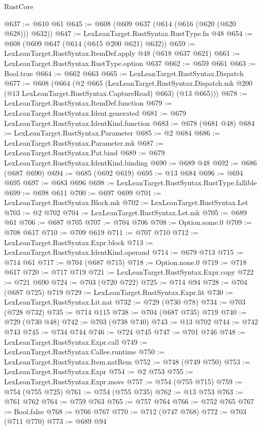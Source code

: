 \begin{lexlean}{RustCore}
\begin{coremodule}
@637 := @610 @61
@645 := @608 (@609 @637 (@614 (@616 (@620 (@620 @628))) @632))
@647 := LexLeanTarget.RustSyntax.RustType.fn @48
@654 := @608 (@609 @647 (@614 (@615 @200 @621) @632))
@659 := LexLeanTarget.RustSyntax.ItemDef.apply @48 (@618 @637 @621)
@661 := LexLeanTarget.RustSyntax.RustType.option @637
@662 := @659 @661
@663 := Bool.true
@664 := @662 @663
@665 := LexLeanTarget.RustSyntax.Dispatch
@677 := @608
    (@664
      (@2
        @665
        (LexLeanTarget.RustSyntax.Dispatch.mk @200 (@13 LexLeanTarget.RustSyntax.CaptureRead) @663)
        (@13 @665)))
@678 := LexLeanTarget.RustSyntax.ItemDef.function
@679 := LexLeanTarget.RustSyntax.Ident.generated
@681 := @679 LexLeanTarget.RustSyntax.IdentKind.function
@683 := @678 (@681 @48)
@684 := LexLeanTarget.RustSyntax.Parameter
@685 := @2 @684
@686 := LexLeanTarget.RustSyntax.Parameter.mk
@687 := LexLeanTarget.RustSyntax.Pat.bind
@689 := @679 LexLeanTarget.RustSyntax.IdentKind.binding
@690 := @689 @48
@692 := @686 (@687 @690)
@694 := @685 (@692 @619)
@695 := @13 @684
@696 := @694 @695
@697 := @683 @696
@698 := LexLeanTarget.RustSyntax.RustType.fallible
@699 := @698 @611
@700 := @697 @699
@701 := LexLeanTarget.RustSyntax.Block.mk
@702 := LexLeanTarget.RustSyntax.Let
@703 := @2 @702
@704 := LexLeanTarget.RustSyntax.Let.mk
@705 := @689 @61
@706 := @687 @705
@707 := @704 @706
@708 := Option.some.{0}
@709 := @708 @617
@710 := @709 @619
@711 := @707 @710
@712 := LexLeanTarget.RustSyntax.Expr.block
@713 := LexLeanTarget.RustSyntax.IdentKind.operand
@714 := @679 @713
@715 := @714 @61
@717 := @704 (@687 @715)
@718 := Option.none.{0}
@719 := @718 @617
@720 := @717 @719
@721 := LexLeanTarget.RustSyntax.Expr.copy
@722 := @721 @690
@724 := @703 (@720 @722)
@725 := @714 @94
@728 := @704 (@687 @725) @719
@729 := LexLeanTarget.RustSyntax.Expr.lit
@730 := LexLeanTarget.RustSyntax.Lit.nat
@732 := @729 (@730 @78)
@734 := @703 (@728 @732)
@735 := @714 @115
@738 := @704 (@687 @735) @719
@740 := @729 (@730 @48)
@742 := @703 (@738 @740)
@743 := @13 @702
@744 := @742 @743
@745 := @734 @744
@746 := @724 @745
@747 := @701 @746
@748 := LexLeanTarget.RustSyntax.Expr.call
@749 := LexLeanTarget.RustSyntax.Callee.runtime
@750 := LexLeanTarget.RustSyntax.Item.natRem
@752 := @748 (@749 @750)
@753 := LexLeanTarget.RustSyntax.Expr
@754 := @2 @753
@755 := LexLeanTarget.RustSyntax.Expr.move
@757 := @754 (@755 @715)
@759 := @754 (@755 @725)
@761 := @754 (@755 @735)
@762 := @13 @753
@763 := @761 @762
@764 := @759 @763
@765 := @757 @764
@766 := @752 @765
@767 := Bool.false
@768 := @766 @767
@770 := @712 (@747 @768)
@772 := @703 (@711 @770)
@773 := @689 @94

\end{coremodule}
\end{lexlean}
